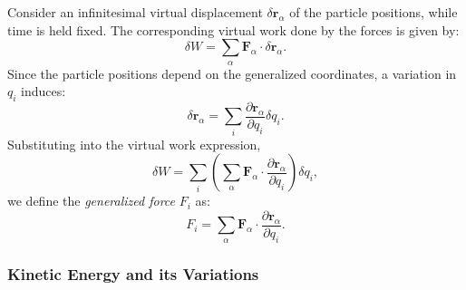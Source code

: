 Consider an infinitesimal virtual displacement \(\delta \mathbf{r}_\alpha\) of the particle positions, while time is held fixed. The corresponding virtual work done by the forces is given by:
\begin{equation}
    \delta W = \sum_\alpha \mathbf{F}_\alpha \cdot \delta \mathbf{r}_\alpha.
\end{equation}
Since the particle positions depend on the generalized coordinates, a variation in \(q_i\) induces:
\begin{equation} \label{eq:virtual_disp}
    \delta \mathbf{r}_\alpha = \sum_{i} \frac{\partial \mathbf{r}_\alpha}{\partial q_i}\delta q_i.
\end{equation}
Substituting into the virtual work expression,
\begin{equation}
    \delta W = \sum_{i} \left(\sum_\alpha \mathbf{F}_\alpha \cdot \frac{\partial \mathbf{r}_\alpha}{\partial q_i}\right)\delta q_i,
\end{equation}
we define the \emph{generalized force} \(F_i\) as:
\begin{equation}
    F_i = \sum_\alpha \mathbf{F}_\alpha \cdot \frac{\partial \mathbf{r}_\alpha}{\partial q_i}.
\end{equation}

\subsubsection*{Kinetic Energy and its Variations}

